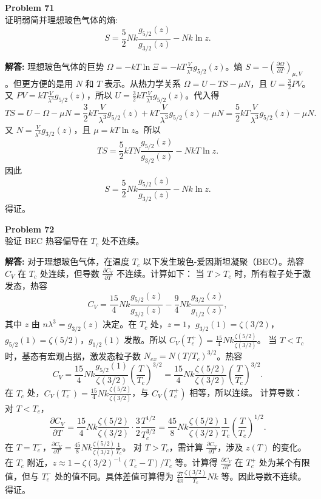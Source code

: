 \documentclass[12pt, a4paper, oneside]{ctexart}
\newenvironment{solution}{\par\noindent\textbf{解答:}\quad}{\par}
\begin{document}
\begin{mdframed}[backgroundcolor=gray!10, linewidth=0pt]
    \textbf{Problem 71} \\
    证明弱简并理想玻色气体的熵:
    \[
    S = \frac{5}{2} N k \frac{g_{5/2}(z)}{g_{3/2}(z)} - N k \ln z.
    \]
\end{mdframed}
\begin{solution}
    理想玻色气体的巨势 $\Omega = -kT \ln \Xi = -kT \frac{V}{\lambda^3} g_{5/2}(z)$。熵 $S = -\left( \frac{\partial \Omega}{\partial T} \right)_{\mu, V}$。但更方便的是用 $N$ 和 $T$ 表示。从热力学关系 $\Omega = U - TS - \mu N$，且 $U = \frac{3}{2} PV$。又 $PV = kT \frac{V}{\lambda^3} g_{5/2}(z)$，所以 $U = \frac{3}{2} kT \frac{V}{\lambda^3} g_{5/2}(z)$。代入得
    \[
    TS = U - \Omega - \mu N = \frac{3}{2} kT \frac{V}{\lambda^3} g_{5/2}(z) + kT \frac{V}{\lambda^3} g_{5/2}(z) - \mu N = \frac{5}{2} kT \frac{V}{\lambda^3} g_{5/2}(z) - \mu N.
    \]
    又 $N = \frac{V}{\lambda^3} g_{3/2}(z)$，且 $\mu = kT \ln z$。所以
    \[
    TS = \frac{5}{2} kT N \frac{g_{5/2}(z)}{g_{3/2}(z)} - N kT \ln z.
    \]
    因此
    \[
    S = \frac{5}{2} N k \frac{g_{5/2}(z)}{g_{3/2}(z)} - N k \ln z.
    \]
    得证。
\end{solution}

\begin{mdframed}[backgroundcolor=gray!10, linewidth=0pt]
    \textbf{Problem 72} \\
    验证 BEC 热容偏导在 $T_c$ 处不连续。
\end{mdframed}
\begin{solution}
    对于理想玻色气体，在温度 $T_c$ 以下发生玻色-爱因斯坦凝聚（BEC）。热容 $C_V$ 在 $T_c$ 处连续，但导数 $\frac{\partial C_V}{\partial T}$ 不连续。计算如下：
    当 $T > T_c$ 时，所有粒子处于激发态，热容
    \[
    C_V = \frac{15}{4} N k \frac{g_{5/2}(z)}{g_{3/2}(z)} - \frac{9}{4} N k \frac{g_{3/2}(z)}{g_{1/2}(z)},
    \]
    其中 $z$ 由 $n \lambda^3 = g_{3/2}(z)$ 决定。在 $T_c$ 处，$z=1$，$g_{3/2}(1) = \zeta(3/2)$，$g_{5/2}(1) = \zeta(5/2)$，$g_{1/2}(1)$ 发散。所以 $C_V(T_c^+) = \frac{15}{4} N k \frac{\zeta(5/2)}{\zeta(3/2)}$。
    当 $T < T_c$ 时，基态有宏观占据，激发态粒子数 $N_{ex} = N (T/T_c)^{3/2}$。热容
    \[
    C_V = \frac{15}{4} N k \frac{g_{5/2}(1)}{\zeta(3/2)} \left( \frac{T}{T_c} \right)^{3/2} = \frac{15}{4} N k \frac{\zeta(5/2)}{\zeta(3/2)} \left( \frac{T}{T_c} \right)^{3/2}.
    \]
    在 $T_c$ 处，$C_V(T_c^-) = \frac{15}{4} N k \frac{\zeta(5/2)}{\zeta(3/2)}$，与 $C_V(T_c^+)$ 相等，所以连续。
    计算导数：对 $T < T_c$，
    \[
    \frac{\partial C_V}{\partial T} = \frac{15}{4} N k \frac{\zeta(5/2)}{\zeta(3/2)} \cdot \frac{3}{2} \frac{T^{1/2}}{T_c^{3/2}} = \frac{45}{8} N k \frac{\zeta(5/2)}{\zeta(3/2)} \frac{1}{T_c} \left( \frac{T}{T_c} \right)^{1/2}.
    \]
    在 $T = T_c^-$，$\frac{\partial C_V}{\partial T} = \frac{45}{8} N k \frac{\zeta(5/2)}{\zeta(3/2)} \frac{1}{T_c}$。
    对 $T > T_c$，需计算 $\frac{\partial C_V}{\partial T}$，涉及 $z(T)$ 的变化。在 $T_c$ 附近，$z \approx 1 - \zeta(3/2)^{-1} (T_c - T)/T_c$ 等。计算得 $\frac{\partial C_V}{\partial T}$ 在 $T_c^+$ 处为某个有限值，但与 $T_c^-$ 处的值不同。具体差值可算得为 $\frac{27}{4\pi} \frac{\zeta(3/2)}{T_c} N k$ 等。因此导数不连续。得证。
\end{solution}
\end{document}

